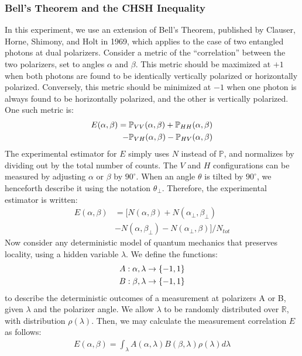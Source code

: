 \documentclass[letter,scriptaddress,twocolumn, prl, nofootinbib]{revtex4}
\newcommand{\set}[1]{\left\{ #1 \right\}}
\begin{document}
\subsubsection{Bell's Theorem and the CHSH Inequality}
In this experiment, we use an extension of Bell's Theorem, published by Clauser, Horne, Shimony, and Holt in 1969, which applies to the case of two entangled photons at dual polarizers. Consider a metric of the ``correlation'' between the two polarizers, set to angles $\alpha$ and $\beta$. This metric should be maximized at $+1$ when both photons are found to be identically vertically polarized or horizontally polarized. Conversely, this metric should be minimized at $-1$ when one photon is always found to be horizontally polarized, and the other is vertically polarized. One such metric is:
\begin{align}
    \label{eq:e_expression}
    E(\alpha, \beta)  = \mathbb{P}_{VV}(\alpha, \beta) + \mathbb{P}_{HH}(\alpha, \beta)  \notag \\ - \mathbb{P}_{VH}(\alpha, \beta) - \mathbb{P}_{HV}(\alpha, \beta)
\end{align}
The experimental estimator for $E$ simply uses $N$ instead of $\mathbb{P}$, and normalizes by dividing out by the total number of counts. The $V$ and $H$ configurations can be measured by adjusting $\alpha$ or $\beta$ by $90^\circ$. When an angle $\theta$ is tilted by $90^\circ$, we henceforth describe it using the notation $\theta_{\perp}$. Therefore, the experimental estimator is written:
\begin{align}
    \label{eq:E_exp_estimator}
    E(\alpha, \beta) &= [N(\alpha, \beta) + N(\alpha_\perp, \beta_\perp) \\
    &- N(\alpha, \beta_\perp) - N(\alpha_\perp, \beta)] /N_{tot}
\end{align}
Now consider any deterministic model of quantum mechanics that preserves locality, using a hidden variable  $\lambda$. We define the functions:
\begin{align}
    A: \alpha, \lambda \to \set{-1, 1} \notag \\
    B: \beta, \lambda \to \set{-1, 1}
\end{align}
to describe the deterministic outcomes of a measurement at polarizers A or B, given $\lambda$ and the polarizer angle. We allow $\lambda$ to be randomly distributed over $\mathbb{R}$, with distribution $\rho(\lambda)$. Then, we may calculate the measurement correlation $E$ as follows:
\begin{align}
    E(\alpha,\beta) = \int_{\lambda} A(\alpha, \lambda)B(\beta, \lambda) \rho(\lambda)d \lambda
\end{align}
\end{document}

